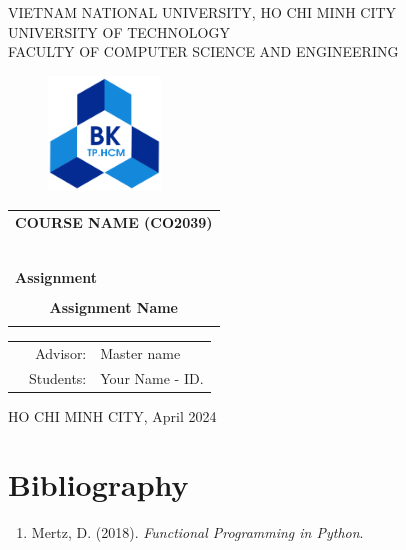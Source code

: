 \documentclass[a4paper]{article}
\begin{document}
\begin{titlepage}
\begin{center}
VIETNAM NATIONAL UNIVERSITY, HO CHI MINH CITY \\
UNIVERSITY OF TECHNOLOGY \\
FACULTY OF COMPUTER SCIENCE AND ENGINEERING
\end{center}

\vspace{1cm}

\begin{figure}[h!]
\begin{center}
\includegraphics[width=3cm]{hcmut.png}
\end{center}
\end{figure}

\vspace{1cm}


\begin{center}
\begin{tabular}{c}
\multicolumn{1}{l}{\textbf{{\Large COURSE NAME (CO2039)}}}\\
~~\\
\hline
\\
\multicolumn{1}{l}{\textbf{{\Large Assignment}}}\\
\\
\textbf{{\Huge Assignment Name }}\\
\\
\hline
\end{tabular}
\end{center}

\vspace{3cm}

\begin{table}[h]
\begin{tabular}{rrl}
\hspace{5 cm} & Advisor: & Master name\\
& Students: & Your Name - ID. \\
\end{tabular}
\end{table}

\begin{center}
{\footnotesize HO CHI MINH CITY, April 2024}
\end{center}
\end{titlepage}



\newpage
\tableofcontents
\newpage


\newpage

\newpage

\section*{Bibliography}

\begin{enumerate}
    \item Mertz, D. (2018). \textit{Functional Programming in Python}.

\end{enumerate}
\end{document}
